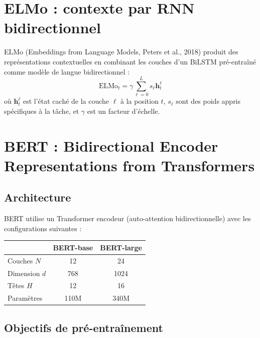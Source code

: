 \section{ELMo : contexte par RNN bidirectionnel}
\label{sec:pre:elmo}

\begin{definition}[ELMo]
ELMo (Embeddings from Language Models, Peters et al., 2018) produit des
repr\'esentations contextuelles en combinant les couches d'un BiLSTM
pr\'e-entra\^in\'e comme mod\`ele de langue bidirectionnel :
\[
\text{ELMo}_t = \gamma \sum_{\ell=0}^{L} s_\ell \mathbf{h}_t^\ell
\]
o\`u $\mathbf{h}_t^\ell$ est l'\'etat cach\'e de la couche $\ell$ \`a la
position $t$, $s_\ell$ sont des poids appris sp\'ecifiques \`a la t\^ache, et
$\gamma$ est un facteur d'\'echelle.
\end{definition}

\section{BERT : Bidirectional Encoder Representations from Transformers}
\label{sec:pre:bert}

\subsection{Architecture}

BERT utilise un Transformer encodeur (auto-attention bidirectionnelle) avec
les configurations suivantes :

\begin{center}
\begin{tabular}{lcc}
\toprule
& \textbf{BERT-base} & \textbf{BERT-large} \\
\midrule
Couches $N$ & 12 & 24 \\
Dimension $d$ & 768 & 1024 \\
T\^etes $H$ & 12 & 16 \\
Param\`etres & 110M & 340M \\
\bottomrule
\end{tabular}
\end{center}

\subsection{Objectifs de pr\'e-entra\^inement}

